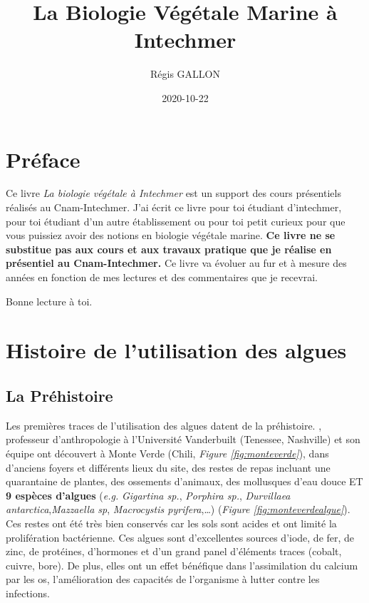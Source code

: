 \documentclass[
]{book}
\title{La Biologie Végétale Marine à Intechmer}
\author{Régis GALLON}
\date{2020-10-22}
\begin{document}
\maketitle

{
\hypersetup{linkcolor=}
\setcounter{tocdepth}{1}
\tableofcontents
}
\hypertarget{pruxe9face}{%
\chapter*{Préface}\label{pruxe9face}}

Ce livre \emph{La biologie végétale à Intechmer} est un support des cours présentiels réalisés au Cnam-Intechmer. J'ai écrit ce livre pour toi étudiant d'intechmer, pour toi étudiant d'un autre établissement ou pour toi petit curieux pour que vous puissiez avoir des notions en biologie végétale marine. \textbf{Ce livre ne se substitue pas aux cours et aux travaux pratique que je réalise en présentiel au Cnam-Intechmer.} Ce livre va évoluer au fur et à mesure des années en fonction de mes lectures et des commentaires que je recevrai.

Bonne lecture à toi.

\hypertarget{histoire}{%
\chapter{Histoire de l'utilisation des algues}\label{histoire}}

\hypertarget{la-pruxe9histoire}{%
\section{La Préhistoire}\label{la-pruxe9histoire}}

Les premières traces de l'utilisation des algues datent de la préhistoire. \citet{dillehay2008}, professeur d'anthropologie à l'Université Vanderbuilt (Tenessee, Nashville) et son équipe ont découvert à Monte Verde (Chili, \emph{Figure \ref{fig:monteverde}}), dans d'anciens foyers et différents lieux du site, des restes de repas incluant une quarantaine de plantes, des ossements d'animaux, des mollusques d'eau douce ET \textbf{9 espèces d'algues} (\emph{e.g.} \emph{Gigartina sp.}, \emph{Porphira sp.}, \emph{Durvillaea antarctica},\emph{Mazzaella sp}, \emph{Macrocystis pyrifera},\ldots) (\emph{Figure \ref{fig:monteverdealgue}}). Ces restes ont été très bien conservés car les sols sont acides et ont limité la prolifération bactérienne.
Ces algues sont d'excellentes sources d'iode, de fer, de zinc, de protéines, d'hormones et d'un grand panel d'éléments traces (cobalt, cuivre, bore). De plus, elles ont un effet bénéfique dans l'assimilation du calcium par les os, l'amélioration des capacités de l'organisme à lutter contre les infections.
\end{document}
